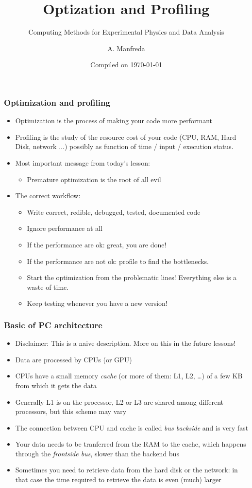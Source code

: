 \documentclass[9pt]{beamer}
\title{Optization and Profiling}
\subtitle{Computing Methods for Experimental Physics and Data Analysis}
\date{Compiled on \today}
\author{A. Manfreda}
\institute[INFN]{INFN--Pisa}
\begin{document}
\titleframe

\begin{frame}
  \frametitle{Optimization and profiling}
  \begin{itemize}
    \item Optimization is the process of making your code more performant
    \item Profiling is the study of the resource cost of your code (CPU,
          RAM, Hard Disk, network $\dots$) possibly as function of 
          time / input / execution status.
    \medskip
    \item Most important message from today's lesson:
    \begin{itemize}
      \item \alert{Premature optimization is the root of all evil}
    \end{itemize}
    \item The correct workflow:
    \begin{itemize}
      \item Write correct, redible, debugged, tested, documented code
      \item Ignore performance at all
      \item If the performance are ok: great, you are done!
      \item If the performance are not ok: \alert{profile} to find the bottlenecks.
      \item Start the optimization from the problematic lines! Everything else is
            a waste of time.
      \item Keep testing whenever you have a new version!
    \end{itemize}
  \end{itemize}
  
\end{frame}


\begin{frame}
  \frametitle{Basic of PC architecture}
  \begin{itemize}
    \item \alert{Disclaimer}: This is a naive description. More on this in the future lessons!
    \medskip
    \item Data are processed by CPUs (or GPU)
    \item CPUs have a small memory \emph{cache} (or more of them: L1, L2, \dots) of a few KB
          from which it gets the data
    \item Generally L1 is on the processor, L2 or L3 are shared among different processors,
          but this scheme may vary
    \item The connection between CPU and cache is called \emph{bus backside} and is very
          fast
    \item Your data needs to be tranferred from the RAM to the cache, which happens
          through the \emph{frontside bus}, slower than the backend bus
    \item Sometimes you need to retrieve data from the hard disk or the network:
          in that case the time required to retrieve the data is even (much) larger
  \end{itemize}
  
\end{frame}
\end{document}
